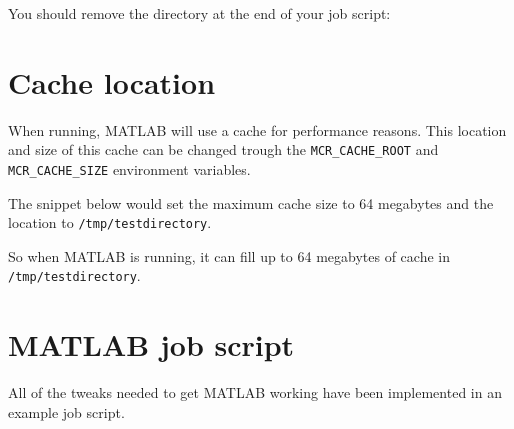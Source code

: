 You should remove the directory at the end of your job script:
\begin{prompt}
\end{prompt}

\section{Cache location}

When running, MATLAB will use a cache for performance reasons. This location
and size of this cache can be changed trough the \verb|MCR_CACHE_ROOT| and
\verb|MCR_CACHE_SIZE| environment variables.

The snippet below would set the maximum cache size to 64 megabytes and the
location to \verb|/tmp/testdirectory|.

\begin{prompt}
\end{prompt}

So when MATLAB is running, it can fill up to 64 megabytes of cache in
\verb|/tmp/testdirectory|.

\section{MATLAB job script}

All of the tweaks needed to get MATLAB working have been implemented in an example
job script.
